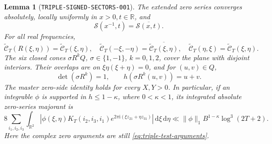 \documentclass[11pt]{article}
\newtheorem{lemma}{Lemma}
\newcommand{\ii}{\mathrm i}
\newcommand{\ZS}{\mathcal S}
\newcommand{\dd}{\,\mathrm d}
\begin{document}
\begin{lemma}[\texttt{TRIPLE-SIGNED-SECTORS-001}]
\label{lem:triple-signed-sectors}
The extended zero series converges absolutely, locally uniformly in
\(x>0,t\in\mathbb R\), and
\begin{equation}\label{eq:triple-reciprocal-reflection}
 \ZS(x^{-1},t)=\overline{\ZS(x,t)}.
\end{equation}
For all real frequencies,
\begin{equation}\label{eq:triple-signed-symmetries}
 \widetilde{\mathcal C}_T(R(\xi,\eta))=\widetilde{\mathcal C}_T(\xi,\eta),\quad
 \widetilde{\mathcal C}_T(-\xi,-\eta)=\overline{\widetilde{\mathcal C}_T(\xi,\eta)},\quad
 \widetilde{\mathcal C}_T(\eta,\xi)=\widetilde{\mathcal C}_T(\xi,\eta).
\end{equation}
The six closed cones \(\sigma R^kQ\), \(\sigma\in\{1,-1\}\),
\(k=0,1,2\), cover the plane with disjoint interiors. Their overlaps
are on \(\xi\eta(\xi+\eta)=0\), and for \((u,v)\in Q\),
\[
 \det(\sigma R^k)=1,\qquad h(\sigma R^k(u,v))=u+v.
\]
The master zero-side identity holds for every \(X,Y>0\). In particular,
if an integrable \(\phi\) is supported in \(h\leq1-\kappa\), where
\(0<\kappa<1\), its integrated absolute zero-series majorant is
\begin{equation}\label{eq:triple-signed-majorant}
 8\sum_{i_1,i_2,i_3}\int_{\mathbb R^2}
 |\phi(\xi,\eta)K_T(i_2,i_3,i_1)
       e^{2\pi\ii(\xi z_{21}+\eta z_{31})}|\dd\xi\dd\eta
 \ll\|\phi\|_1B^{1-\kappa}\log^3(2T+2).
\end{equation}
Here the complex zero arguments are still \eqref{eq:triple-test-arguments}.
\end{lemma}
\end{document}
